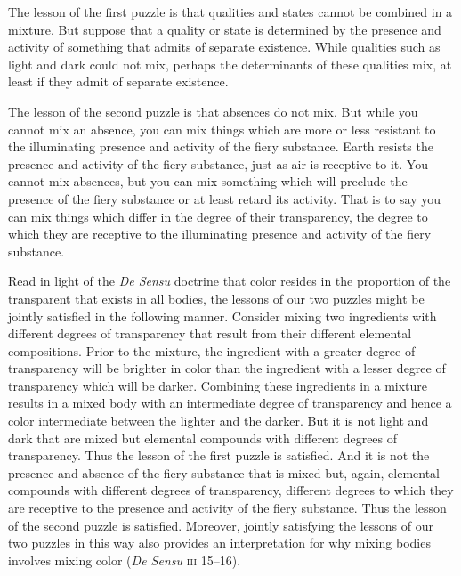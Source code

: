 The lesson of the first puzzle is that qualities and states cannot be combined in a mixture. But suppose that a quality or state is determined by the presence and activity of something that admits of separate existence. While qualities such as light and dark could not mix, perhaps the determinants of these qualities mix, at least if they admit of separate existence.

The lesson of the second puzzle is that absences do not mix. But while you cannot mix an absence, you can mix things which are more or less resistant to the illuminating presence and activity of the fiery substance. Earth resists the presence and activity of the fiery substance, just as air is receptive to it. You cannot mix absences, but you can mix something which will preclude the presence of the fiery substance or at least retard its activity. That is to say you can mix things which differ in the degree of their transparency, the degree to which they are receptive to the illuminating presence and activity of the fiery substance.

Read in light of the \emph{De Sensu} doctrine that color resides in the proportion of the transparent that exists in all bodies, the lessons of our two puzzles might be jointly satisfied in the following manner. Consider mixing two ingredients with different degrees of transparency that result from their different elemental compositions. Prior to the mixture, the ingredient with a greater degree of transparency will be brighter in color than the ingredient with a lesser degree of transparency which will be darker. Combining these ingredients in a mixture results in a mixed body with an intermediate degree of transparency and hence a color intermediate between the lighter and the darker. But it is not light and dark that are mixed but elemental compounds with different degrees of transparency. Thus the lesson of the first puzzle is satisfied. And it is not the presence and absence of the fiery substance that is mixed but, again, elemental compounds with different degrees of transparency, different degrees to which they are receptive to the presence and activity of the fiery substance. Thus the lesson of the second puzzle is satisfied. Moreover, jointly satisfying the lessons of our two puzzles in this way also provides an interpretation for why mixing bodies involves mixing color (\emph{De Sensu} \textsc{iii} 15--16).

